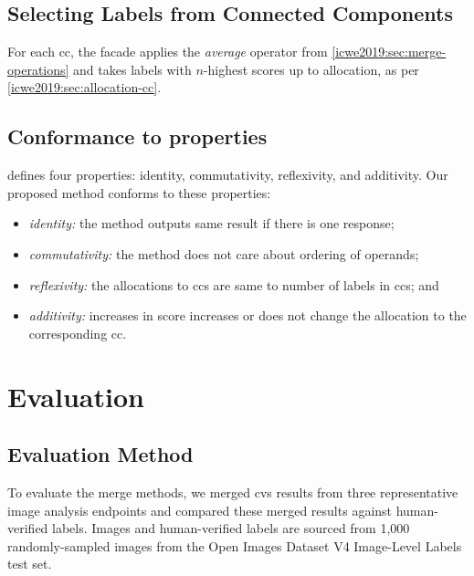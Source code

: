 \subsection{Selecting Labels from Connected Components}\label{icwe2019:sec:select-highest}

For each \gls{cc}, the facade applies the \textit{average} operator from \cref{icwe2019:sec:merge-operations} and takes labels with $n$-highest scores up to allocation, as per \cref{icwe2019:sec:allocation-cc}.

\subsection{Conformance to properties}

 defines four properties: identity, commutativity, reflexivity, and additivity.
Our proposed method conforms to these properties:

\begin{itemize}
  \item \textit{identity:} the method outputs same result if there is one response;
  \item \textit{commutativity:} the method does not care about ordering of operands;
  \item \textit{reflexivity:} the allocations to \glspl{cc} are same to number of labels in \glspl{cc}; and
  \item \textit{additivity:} increases in score increases or does not change the allocation to the corresponding \gls{cc}.
\end{itemize}

\section{Evaluation}\label{icwe2019:sec:evaluation}

\subsection{Evaluation Method}\label{icwe2019:sec:evaluation-method}

To evaluate the merge methods, we merged \gls{cvs} results from three representative image analysis  endpoints and compared these merged results against human-verified labels.
Images and human-verified labels are sourced from 1,000 randomly-sampled images from the Open Images Dataset V4  Image-Level Labels test set.

